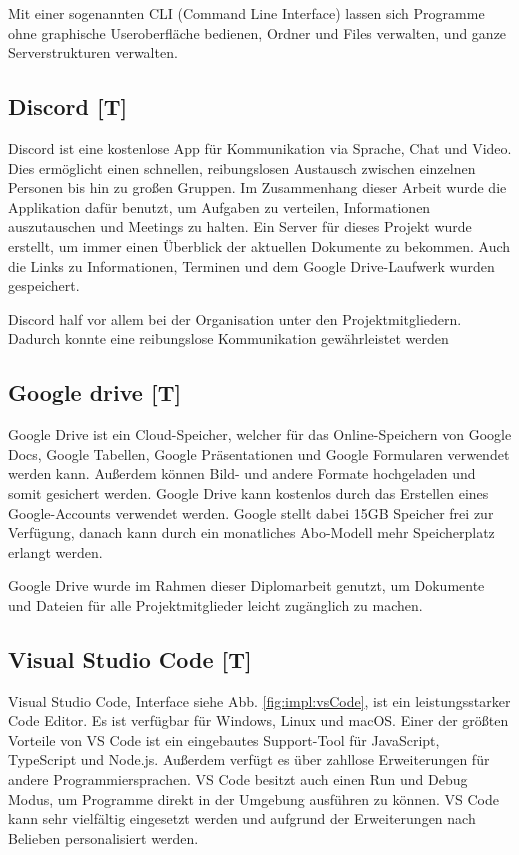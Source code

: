 Mit einer sogenannten CLI (Command Line Interface) lassen sich Programme ohne graphische Useroberfläche bedienen, Ordner und Files verwalten, und ganze Serverstrukturen verwalten. 
\subsection{Discord [T]} 
Discord ist eine kostenlose App für Kommunikation via Sprache, Chat und Video. Dies ermöglicht einen schnellen, reibungslosen Austausch zwischen einzelnen Personen bis hin zu großen Gruppen. Im Zusammenhang dieser Arbeit wurde die Applikation dafür benutzt, um Aufgaben zu verteilen, Informationen auszutauschen und Meetings zu halten. Ein Server für dieses Projekt wurde erstellt, um immer einen Überblick der aktuellen Dokumente zu bekommen. Auch die Links zu Informationen, Terminen und dem Google Drive-Laufwerk wurden gespeichert.   

Discord half vor allem bei der Organisation unter den Projektmitgliedern. Dadurch konnte eine reibungslose Kommunikation gewährleistet werden  
\subsection{Google drive [T]} 

Google Drive ist ein Cloud-Speicher, welcher für das Online-Speichern von Google Docs, Google Tabellen, Google Präsentationen und Google Formularen verwendet werden kann. Außerdem können Bild- und andere Formate hochgeladen und somit gesichert werden. Google Drive kann kostenlos durch das Erstellen eines Google-Accounts verwendet werden. Google stellt dabei 15GB Speicher frei zur Verfügung, danach kann durch ein monatliches Abo-Modell mehr Speicherplatz erlangt werden. \cite{OneDriveOfficialSite}

Google Drive wurde im Rahmen dieser Diplomarbeit genutzt, um Dokumente und Dateien für alle Projektmitglieder leicht zugänglich zu machen.

\subsection{Visual Studio Code [T]} 
Visual Studio Code, Interface siehe Abb. \ref{fig:impl:vsCode}, ist ein leistungsstarker Code Editor. Es ist verfügbar für Windows, Linux und macOS. 
Einer der größten Vorteile von VS Code ist ein eingebautes Support-Tool für JavaScript, TypeScript und Node.js. Außerdem verfügt es über zahllose Erweiterungen für andere Programmiersprachen. VS Code besitzt auch einen Run und Debug Modus, um Programme direkt in der Umgebung ausführen zu können. 
VS Code kann sehr vielfältig eingesetzt werden und aufgrund der Erweiterungen nach Belieben personalisiert werden. \cite{VSCodeOfficialSite}

